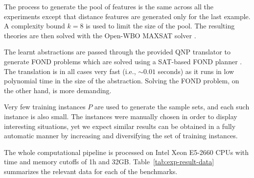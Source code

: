 \documentclass[letterpaper]{article} %
\newcommand{\alert}[1]{\textcolor{red}{\bf #1}}
\begin{document}
%

The process to generate the pool of features is the same across all the
experiments except that distance features are generated only for the
last example. A complexity bound $k=8$ is used to limit the size of the
pool.
The resulting theories are then solved with the Open-WBO MAXSAT solver
\cite{martins2014open}.

The learnt abstractions are passed through the provided QNP translator 
to generate FOND problems which are solved using a SAT-based FOND
planner \cite{tomas:fond-sat}. The translation is in all cases very fast
(i.e., $\sim 0.01$ seconds) as it runs in low polynomial time in the size
of the abstraction. Solving the FOND problem, on the other hand, is
more demanding.



Very few training instances $P$ are used to generate the sample sets,
and each such instance is also small. The instances were manually
chosen in order to display interesting situations, yet we expect
similar results can be obtained in a fully automatic manner by 
increasing and diversifying the set of training instances.

The whole computational pipeline is processed on Intel Xeon E5-2660 CPUs
with time and memory cutoffs of 1h and 32GB.
Table~\ref{tab:exp-result-data} summarizes the relevant data for each
of the benchmarks.
\end{document}
